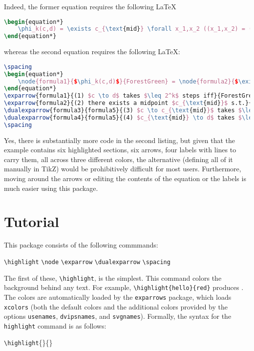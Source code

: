 \documentclass{article} %
\newcommand{\tbs}{\textbackslash} %
\newcommand{\ttt}{\texttt} %
\begin{document}
Indeed, the former equation requires the following \LaTeX
\begin{lstlisting}[language=TeX, caption=\LaTeX \,\! for Equation Without Annotation]
\begin{equation*}
    \phi_k(c,d) = \exists c_{\text{mid}} \forall x_1,x_2 ((x_1,x_2) = (c,c_{\text{mid}}) \lor (x_1,x_2) = (c_{\text{mid}},d)) \Rightarrow \phi_{k-1}(x_1,x_2)].
\end{equation*}
\end{lstlisting}
whereas the second equation requires the following \LaTeX: 
\begin{lstlisting}[language=TeX, caption=\LaTeX \,\! for Equation With Annotation]
\spacing
\begin{equation*}
    \node{formula1}{$\phi_k(c,d)$}{ForestGreen} = \node{formula2}{$\exists c_{\text{mid}}$}{blue} \forall x_1,x_2 [\node{formula3}{$((x_1,x_2) = (c,c_{\text{mid}})$}{red} \lor \node{formula4}{$(x_1,x_2) = (c_{\text{mid}},d))$}{red} \Rightarrow \node{formula5}{$\phi_{k-1}(x_1,x_2)$}{red}].
\end{equation*}
\exparrow{formula1}{(1) $c \to d$ takes $\leq 2^k$ steps iff}{ForestGreen}{dr}
\exparrow{formula2}{(2) there exists a midpoint $c_{\text{mid}}$ s.t.}{blue}{ur}
\dualexparrow{formula3}{formula5}{(3) $c \to c_{\text{mid}}$ takes $\leq 2^{k-1}$ steps and}{red}{d}
\dualexparrow{formula4}{formula5}{(4) $c_{\text{mid}} \to d$ takes $\leq 2^{k-1}$ steps.}{red}{u}
\spacing
\end{lstlisting}
Yes, there is substantially more code in the second listing, but given that the example contains six highlighted sections, six arrows, four labels with lines to carry them, all across three different colors, the alternative (defining all of it manually in TikZ) would be prohibitively difficult for most users. Furthermore, moving around the arrows or editing the contents of the equation or the labels is much easier using this package. \newpage

\section{Tutorial}

This package consists of the following commmands: 
\begin{center}
    \ttt{\tbs highlight} \qquad \ttt{\tbs node}  \qquad \ttt{\tbs exparrow}  \qquad \ttt{\tbs dualexparrow} \qquad \ttt{\tbs spacing}
\end{center}
The first of these, \ttt{\tbs highlight}, is the simplest. This command colors the background behind any text. For example, \ttt{\tbs highlight\{hello\}\{red\}} produces . The colors are automatically loaded by the \ttt{exparrows} package, which loads \ttt{xcolors} (both the default colors and the additional colors provided by the options \ttt{usenames}, \ttt{dvipsnames}, and \ttt{svgnames}). Formally, the syntax for the \ttt{highlight} command is as follows: 
\begin{center}
    \ttt{\tbs highlight}\{\}\{\}
\end{center}
\exparrow{12}{any color defined in \ttt{xcolors}}{blue}{dr}
\spacing
\end{document}
